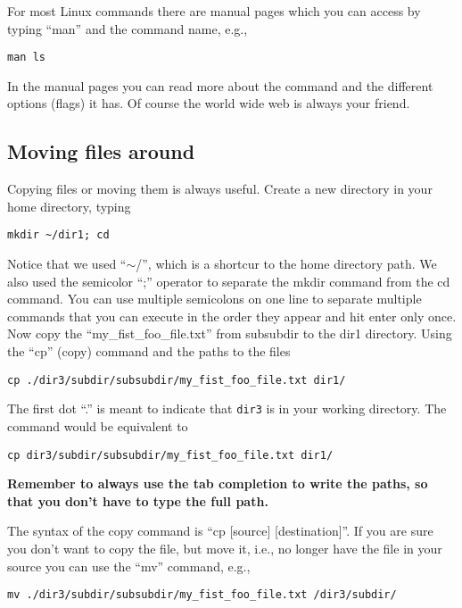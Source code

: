 \documentclass[aps,showpacs,prd,notitlepage,preprintnumbers,amsmath,amssymb,letterpaper]{revtex4}
\begin{document}
For most Linux commands there are manual pages which you can access by typing ``man'' and the command name, e.g.,

\begin{verbatim}
man ls
\end{verbatim}

In the manual pages you can read more about the command and the
different options (flags) it has. Of course the world wide web is always
your friend.

\subsection{Moving files around}

Copying files or moving them is always useful. Create a new directory in your home directory, typing

\begin{verbatim}
mkdir ~/dir1; cd
\end{verbatim}

Notice that we used ``$\sim$/'', which is a shortcur to the home
directory path. We also used the semicolor ``;'' operator to separate
the mkdir command from the cd command. You can use multiple semicolons
on one line to separate multiple commands that you can execute in the
order they appear and hit enter only once. Now copy the
``my\_fist\_foo\_file.txt'' from subsubdir to the dir1
directory. Using the ``cp'' (copy) command and the paths to the files

\begin{verbatim}
cp ./dir3/subdir/subsubdir/my_fist_foo_file.txt dir1/
\end{verbatim}

The first dot ``.'' is meant to indicate that {\tt dir3} is in your working directory.
The command would be equivalent to

\begin{verbatim}
cp dir3/subdir/subsubdir/my_fist_foo_file.txt dir1/
\end{verbatim}


{\bf Remember to always use the tab completion to write the paths, so
  that you don't have to type the full path.}


The syntax of the copy command is ``cp [source] [destination]''. If you are sure
you don't want to copy the file, but move it, i.e., no longer have the file
in your source you can use the ``mv'' command, e.g.,

\begin{verbatim}
mv ./dir3/subdir/subsubdir/my_fist_foo_file.txt /dir3/subdir/
\end{verbatim}
\end{document}

